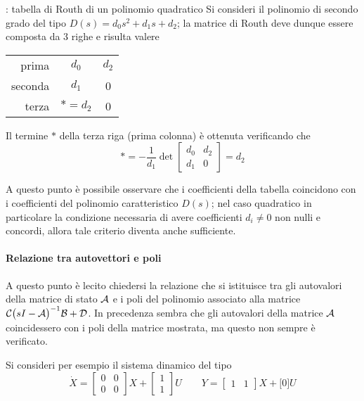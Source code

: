 		\begin{esempio}{: tabella di Routh di un polinomio quadratico}
			Si consideri il polinomio di secondo grado del tipo $D(s) = d_0s^2 + d_1 s + d_2$; la matrice di Routh deve dunque essere composta da 3 righe e risulta valere
			\begin{center}
			\begin{tabular}{r | c c} 
				prima & $d_0$ & $d_2$ \\
				seconda & $d_1$ & 0 \\ 
				terza &  $*=d_2$ & 0
			\end{tabular}
			\end{center}
			Il termine $*$  della terza riga (prima colonna) è ottenuta verificando che
			\[ * = - \frac 1 {d_1} \det \begin{bmatrix}
				d_0 & d_2 \\ d_1 & 0
			\end{bmatrix} = d_2 \]
		
			A questo punto è possibile osservare che i coefficienti della tabella coincidono con i coefficienti del polinomio caratteristico $D(s)$; nel caso quadratico in particolare la condizione necessaria di avere coefficienti $d_i\neq0$ non nulli e concordi, allora tale criterio diventa anche sufficiente.
		\end{esempio}
		
		
		\paragraph{Relazione tra autovettori e poli} A questo punto è lecito chiedersi la relazione che si istituisce tra gli autovalori della matrice di stato $\mathcal A$ e i poli del polinomio associato alla matrice $\mathcal C\big(sI- \mathcal A\big)^{-1}\mathcal B + \mathcal D$. In precedenza sembra che gli autovalori della matrice $\mathcal A$ coincidessero con i poli della matrice mostrata, ma questo non sempre è verificato.
		
		Si consideri per esempio il sistema dinamico del tipo
		\[ \dot X = \begin{bmatrix}
			0 & 0 \\ 0& 0 
		\end{bmatrix} X + \begin{bmatrix}
			1 \\ 1 
		\end{bmatrix} U \qquad Y = \begin{bmatrix}
			1 & 1 
		\end{bmatrix} X + \big[0\big]U \]
		
